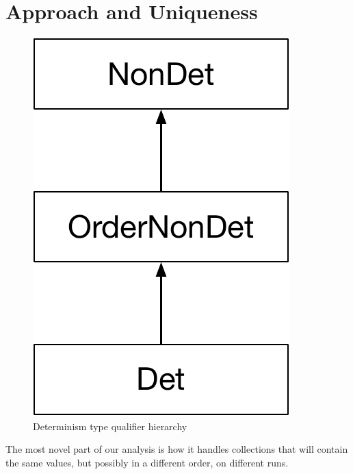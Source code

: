 \section{Approach and Uniqueness\label{sec:approach}}
\begin{figure}
    \begin{center}
        \includegraphics[scale=0.37]{detHierarchy}
    \end{center}
    \caption{Determinism type qualifier hierarchy}
    \label{fig:determinism-hierarchy}
\end{figure}

The most novel part of our analysis is how it handles collections that will
contain the same values, but
possibly in a different order, on different runs.

